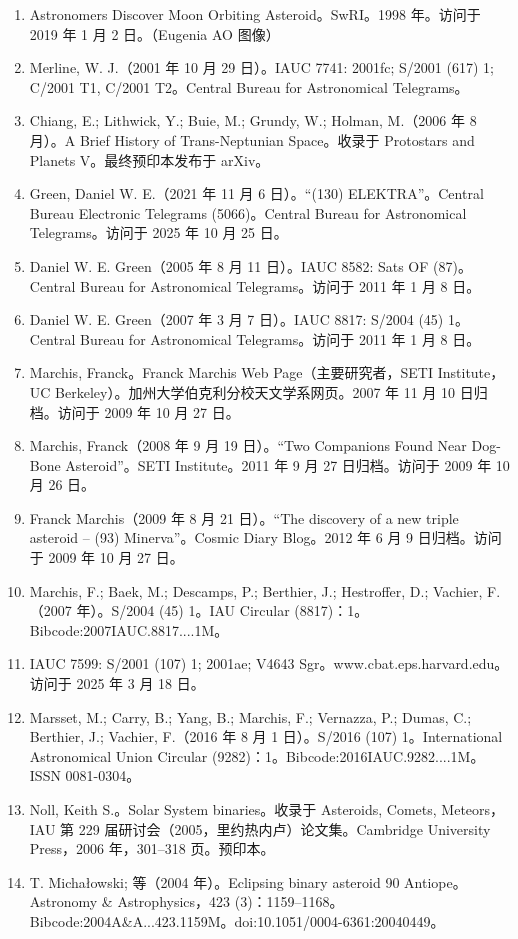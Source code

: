 \begin{enumerate}
\item Astronomers Discover Moon Orbiting Asteroid。SwRI。1998 年。访问于 2019 年 1 月 2 日。（Eugenia AO 图像）
\item Merline, W. J.（2001 年 10 月 29 日）。IAUC 7741: 2001fc; S/2001 (617) 1; C/2001 T1, C/2001 T2。Central Bureau for Astronomical Telegrams。
\item Chiang, E.; Lithwick, Y.; Buie, M.; Grundy, W.; Holman, M.（2006 年 8 月）。A Brief History of Trans-Neptunian Space。收录于 Protostars and Planets V。最终预印本发布于 arXiv。
\item Green, Daniel W. E.（2021 年 11 月 6 日）。“(130) ELEKTRA”。Central Bureau Electronic Telegrams (5066)。Central Bureau for Astronomical Telegrams。访问于 2025 年 10 月 25 日。
\item Daniel W. E. Green（2005 年 8 月 11 日）。IAUC 8582: Sats OF (87)。Central Bureau for Astronomical Telegrams。访问于 2011 年 1 月 8 日。
\item Daniel W. E. Green（2007 年 3 月 7 日）。IAUC 8817: S/2004 (45) 1。Central Bureau for Astronomical Telegrams。访问于 2011 年 1 月 8 日。
\item Marchis, Franck。Franck Marchis Web Page（主要研究者，SETI Institute，UC Berkeley）。加州大学伯克利分校天文学系网页。2007 年 11 月 10 日归档。访问于 2009 年 10 月 27 日。
\item Marchis, Franck（2008 年 9 月 19 日）。“Two Companions Found Near Dog-Bone Asteroid”。SETI Institute。2011 年 9 月 27 日归档。访问于 2009 年 10 月 26 日。
\item Franck Marchis（2009 年 8 月 21 日）。“The discovery of a new triple asteroid – (93) Minerva”。Cosmic Diary Blog。2012 年 6 月 9 日归档。访问于 2009 年 10 月 27 日。
\item Marchis, F.; Baek, M.; Descamps, P.; Berthier, J.; Hestroffer, D.; Vachier, F.（2007 年）。S/2004 (45) 1。IAU Circular (8817)：1。Bibcode:2007IAUC.8817....1M。
\item IAUC 7599: S/2001 (107) 1; 2001ae; V4643 Sgr。www.cbat.eps.harvard.edu。访问于 2025 年 3 月 18 日。
\item Marsset, M.; Carry, B.; Yang, B.; Marchis, F.; Vernazza, P.; Dumas, C.; Berthier, J.; Vachier, F.（2016 年 8 月 1 日）。S/2016 (107) 1。International Astronomical Union Circular (9282)：1。Bibcode:2016IAUC.9282....1M。ISSN 0081-0304。
\item Noll, Keith S.。Solar System binaries。收录于 Asteroids, Comets, Meteors，IAU 第 229 届研讨会（2005，里约热内卢）论文集。Cambridge University Press，2006 年，301–318 页。预印本。
\item T. Michałowski; 等（2004 年）。Eclipsing binary asteroid 90 Antiope。Astronomy & Astrophysics，423 (3)：1159–1168。Bibcode:2004A&A...423.1159M。doi:10.1051/0004-6361:20040449。
\end{enumerate}